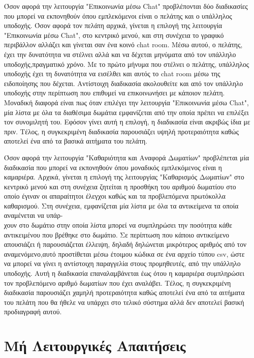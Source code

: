 \noindent
Όσον αφορά την λειτουργία "Επικοινωνία μέσω Chat" προβλέπονται δύο διαδικασίες που μπορεί να 
εκπονηθούν όπου εμπλεκόμενοι είναι ο πελάτης και ο υπάλληλος υποδοχής. Όσον αφορά τον πελάτη
αρχικά, γίνεται η επιλογή της λειτουργία "Επικοινωνία μέσω Chat", στο κεντρικό μενού, και στη 
συνέχεια το γραφικό περιβάλλον αλλάζει και γίνεται σαν ένα κοινό chat room.  Μέσω αυτού, ο 
πελάτης, έχει την δυνατότητα να στέλνει αλλά και να δέχεται μηνύματα από τον υπάλληλο 
υποδοχής,πραγματικό χρόνο. Με το πρώτο μήνυμα που στέλνει ο πελάτης, υπάλληλος υποδοχής 
έχει τη δυνατότητα να εισέλθει και αυτός το chat room μέσω της ειδοποίησης που δέχεται.  
Αντίστοιχη διαδικασία ακολουθείτε και από τον υπάλληλο υποδοχής στην περίπτωση που 
επιθυμεί να επικοινωνήσει με κάποιον πελάτη. Μοναδική διαφορά είναι πως όταν επιλέγει την 
λειτουργία "Επικοινωνία μέσω Chat", μία λίστα με όλα τα διαθέσιμα δωμάτια εμφανίζεται από την
οποία πρέπει να επιλέξει τον συνομιλητή του. Εφόσον γίνει αυτή η επιλογή, η διαδικασία είναι 
ακριβώς ίδια με πριν. Τέλος, η συγκεκριμένη διαδικασία παρουσιάζει υψηλή προτεραιότητα
καθώς αποτελεί ένα από τα βασικά αιτήματα του πελάτη.
\clearpage

\noindent
Όσον αφορά την λειτουργία "Καθαριότητα και Αναφορά Δωματίων" προβλέπεται μία διαδικασία
που μπορεί να εκπονηθούν όπου μοναδικός εμπλεκόμενος είναι η καμαριέρα. Αρχικά, γίνεται η 
επιλογή της λειτουργίας "Καθαρισμός Δωματίων" στο κεντρικό  μενού και στη συνέχεια ζητείται 
η προσθήκη του αριθμού δωματίου στο οποίο έγιναν οι απαραίτητοι έλεγχοι καθώς και τα 
προβλεπόμενα πρωτόκολλα καθαρισμού. Στη συνέχεια, εμφανίζεται μία λίστα με όλα τα αντικείμενα
τα οποία αναμένεται να υπάρ-\\χουν στο δωμάτιο στην οποία λίστα μπορεί να συμπληρώσει 
την ποσότητα κάθε αντικειμένου που βρέθηκε στο δωμάτιο. Σε περίπτωση που κάποιο 
αντικείμενο απουσιάζει ή παρουσιάζεται έλλειψη, δηλαδή δηλώνεται μικρότερος αριθμός από 
τον αναμενόμενο,αυτό προστίθεται μέσω έτοιμου κώδικα σε ένα αρχείο τύπου csv, ώστε να 
μπορεί να γίνει η αντίστοιχη παραγγελία στους προμηθευτές, από την υπάλληλο υποδοχής.
Αυτή η διαδικασία επαναλαμβάνεται έως ότου η καμαριέρα συμπληρώσει τον προβλεπόμενο 
αριθμό δωματίων που έχει αναλάβει. Τέλος, η συγκεκριμένη διαδικασία παρουσιάζει χαμηλή 
προτεραιότητα καθώς αποτελεί ένα από τα αιτήματα του πελάτη που θα ήθελε να υπάρχει στο 
τελικό σύστημα αλλά δεν αποτελεί βασική προδιαγραφή αυτού. \\

\section{Μή Λειτουργικές Απαιτήσεις}
